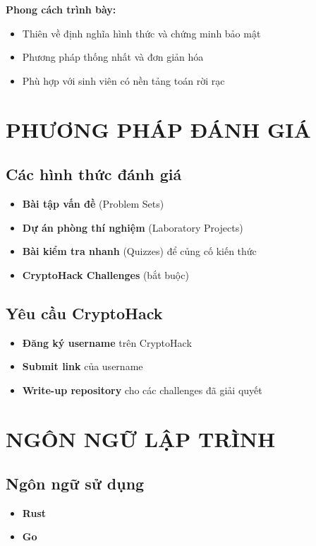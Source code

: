 \textbf{Phong cách trình bày:}
\begin{itemize}
\item Thiên về định nghĩa hình thức và chứng minh bảo mật
\item Phương pháp thống nhất và đơn giản hóa
\item Phù hợp với sinh viên có nền tảng toán rời rạc
\end{itemize}

\section{PHƯƠNG PHÁP ĐÁNH GIÁ}

\subsection{Các hình thức đánh giá}
\begin{itemize}
\item \textbf{Bài tập vấn đề} (Problem Sets)
\item \textbf{Dự án phòng thí nghiệm} (Laboratory Projects)
\item \textbf{Bài kiểm tra nhanh} (Quizzes) để củng cố kiến thức
\item \textbf{CryptoHack Challenges} (bắt buộc)
\end{itemize}

\subsection{Yêu cầu CryptoHack}
\begin{itemize}
\item \textbf{Đăng ký username} trên CryptoHack
\item \textbf{Submit link} của username
\item \textbf{Write-up repository} cho các challenges đã giải quyết
\end{itemize}

\section{NGÔN NGỮ LẬP TRÌNH}

\subsection{Ngôn ngữ sử dụng}
\begin{itemize}
\item \textbf{Rust}
\item \textbf{Go}
\end{itemize}

